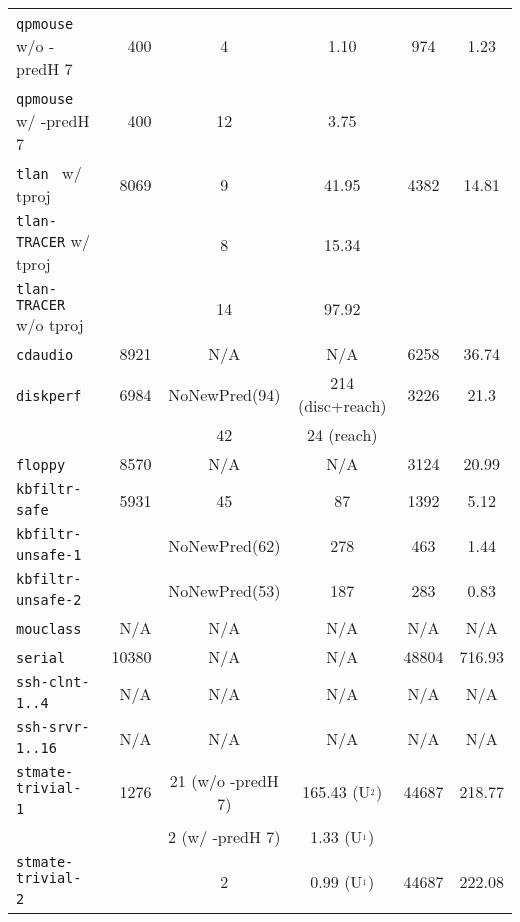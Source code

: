 \begin{figure*}[tbh]
\begin{small}
\begin{center}
\begin{tabular}{|l|r||c|c||c|c|}
\texttt{qpmouse}~\cite{BLAST-web} w/o -predH 7 & 400 & 4  &  1.10 &  974  &  1.23  \\ 
\texttt{qpmouse}~\cite{BLAST-web} w/ -predH 7  & 400 & 12 &  3.75 &    &    \\ 
\hline
\texttt{tlan}~\cite{BLAST-web} w/ tproj &  8069 &   9  &  41.95 &  4382 &   14.81     \\ 
\texttt{tlan-TRACER} w/  tproj &       &   8  &  15.34 &       &        \\ 
\texttt{tlan-TRACER} w/o tproj &       &  14  &  97.92 &       &       \\ 
\hline 
\hline
\texttt{cdaudio}~\cite{BLAST-web}&  8921 &  N/A   &  N/A         &  6258      &  36.74  \\ 
\hline
\texttt{diskperf}~\cite{BLAST-web}&  6984  &   NoNewPred(94) &  214 (disc+reach) &  3226  & 21.3     \\ 
                                  &        &  42              & 24 (reach)       &        &           \\
\hline
\texttt{floppy}~\cite{BLAST-web}&  8570 &    N/A        &  N/A         &  3124  & 20.99     \\ 
\hline
\texttt{kbfiltr-safe}~\cite{BLAST-web}& 5931 &  45        &  87    &  1392   & 5.12      \\  
\texttt{kbfiltr-unsafe-1}~\cite{BLAST-web}& &  NoNewPred(62) &  278    &  463      & 1.44      \\ 
\texttt{kbfiltr-unsafe-2}~\cite{BLAST-web}& &  NoNewPred(53)   &  187    &  283      & 0.83      \\ \hline 
\texttt{mouclass}~\cite{BLAST-web}& N/A   &  N/A   &  N/A         &  N/A      &  N/A         \\ \hline 
\texttt{serial}~\cite{BLAST-web}& 10380   &  N/A   &  N/A         &  48804     &  716.93         \\ \hline 
\hline
\texttt{ssh-clnt-1..4}~\cite{BLAST-web}&   N/A   &    N/A  &  N/A  &  N/A      &  N/A         \\ 
\texttt{ssh-srvr-1..16}~\cite{BLAST-web}&   N/A   & N/A    &  N/A   &  N/A      &  N/A         \\ \hline 
\hline
\texttt{stmate-trivial-1}~\cite{malardalenbenchmark}& 1276  & 21 (w/o -predH 7) & 165.43 (U$^{_2}$) & 44687  & 218.77    \\ 
                                                    &   &  2 (w/ -predH 7)  & 1.33 (U$^{_1}$)&    &           \\ 
\texttt{stmate-trivial-2}~\cite{malardalenbenchmark}&  &  2 &   0.99 (U$^{_1}$)   & 44687  & 222.08    \\ 

\end{tabular}
\end{center}
\end{small}
\end{figure*}

